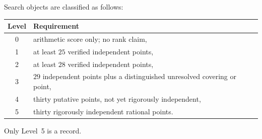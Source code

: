 Search objects are classified as follows:
\begin{center}
\begin{tabular}{cl}
\toprule
Level & Requirement \\
\midrule
0 & arithmetic score only; no rank claim, \\
1 & at least $25$ verified independent points, \\
2 & at least $28$ verified independent points, \\
3 & $29$ independent points plus a distinguished unresolved covering or point, \\
4 & thirty putative points, not yet rigorously independent, \\
5 & thirty rigorously independent rational points. \\
\bottomrule
\end{tabular}
\end{center}
Only Level~5 is a record.
